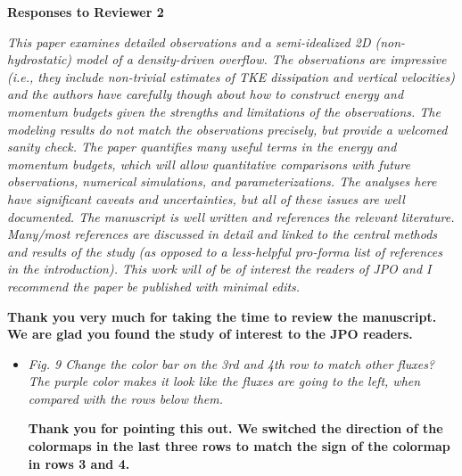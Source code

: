 \documentclass[11pt]{article}
\begin{document}
\begin{flushleft}

\clearpage

\centerline{\textbf{Responses to Reviewer 2}}
\vspace{0.05in}

\textit{This paper examines detailed observations and a semi-idealized 2D (non-hydrostatic) model of a density-driven overflow. The observations are impressive (i.e., they include non-trivial estimates of TKE dissipation and vertical velocities) and the authors have carefully though about how to construct energy and momentum budgets given the strengths and limitations of the observations. The modeling results do not match the observations precisely, but provide a welcomed sanity check. The paper quantifies many useful terms in the energy and momentum budgets, which will allow quantitative comparisons with future observations, numerical simulations, and parameterizations. The analyses here have significant caveats and uncertainties, but all of these issues are well documented. The manuscript is well written and references the relevant literature. Many/most references are discussed in detail and linked to the central methods and results of the study (as opposed to a less-helpful pro-forma list of references in the introduction). This work will of be of interest the readers of JPO and I recommend the paper be published with minimal edits.}
\vspace{0.05in}

\textbf{Thank you very much for taking the time to review the manuscript. We are glad you found the study of interest to the JPO readers.}

\begin{itemize}
\item \textit{Fig. 9 Change the color bar on the 3rd and 4th row to match other fluxes? The purple color makes it look like the fluxes are going to the left, when compared with the rows below them.}

\textbf{Thank you for pointing this out. We switched the direction of the colormaps in the last three rows to match the sign of the colormap in rows 3 and 4.}

\end{itemize}

\clearpage

\end{flushleft}
\end{document}

